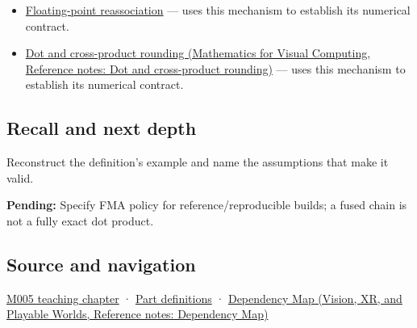 \hypertarget{appendix-41e8ef22a21e-used-by}{}

\begin{itemize}
\tightlist
\item
  \hyperref[appendix-c2ac4a84c283]{Floating-point reassociation} --- uses this mechanism to establish its numerical contract.
\item
  \href{../02-Mathematics-for-Visual-Computing/main.pdf\#nameddest=appendix-5aef4f13483a}{Dot and cross-product rounding (Mathematics for Visual Computing, Reference notes: Dot and cross-product rounding)} --- uses this mechanism to establish its numerical contract.
\end{itemize}

\subsection{Recall and next depth}\label{appendix-41e8ef22a21e-recall-and-next-depth}

\hypertarget{appendix-41e8ef22a21e-recall-and-next-depth}{}

Reconstruct the definition's example and name the assumptions that make it valid.

\textbf{Pending:} Specify FMA policy for reference/reproducible builds; a fused chain is not a fully exact dot product.

\subsection{Source and navigation}\label{appendix-41e8ef22a21e-source-and-navigation}

\hypertarget{appendix-41e8ef22a21e-source-and-navigation}{}

\hyperref[01-foundations-i-ch001-when-arithmetic-meets-uncertainty]{M005 teaching chapter} · \hyperref[appendix-fd090d982a15-m005---parts-77-88]{Part definitions} · \href{../07-Vision-XR-and-Playable-Worlds/main.pdf\#nameddest=appendix-4ad47bdd269a}{Dependency Map (Vision, XR, and Playable Worlds, Reference notes: Dependency Map)}

